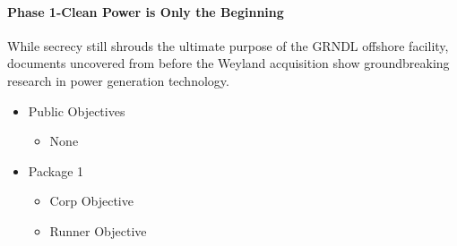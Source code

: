 \documentclass[titlepage]{article}
\begin{document}
\paragraph{Phase 1-Clean Power is Only the Beginning}

While secrecy still shrouds the ultimate purpose of the GRNDL offshore facility, documents uncovered from before the Weyland acquisition show groundbreaking research in power generation technology.
\begin{itemize}
	\item Public Objectives
		\begin{itemize}
			\item None
		\end{itemize}
	\item Package 1
		\begin{itemize}
			\item Corp Objective
			\item Runner Objective 
		\end{itemize}
\end{itemize}
\end{document}

